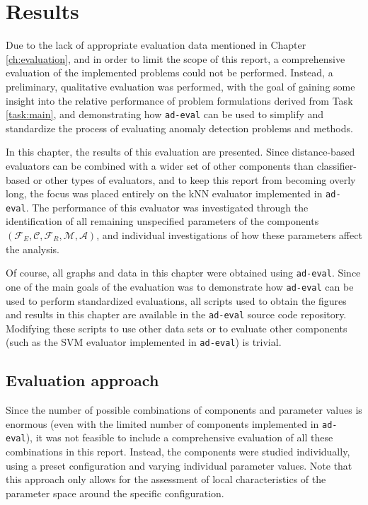 \chapter{Results}
\label{ch:results}

Due to the lack of appropriate evaluation data mentioned in Chapter \ref{ch:evaluation}, and in order to limit the scope of this report, a comprehensive evaluation of the implemented problems could not be performed. Instead, a preliminary, qualitative evaluation was performed, with the goal of gaining some insight into the relative performance of problem formulations derived from Task \ref{task:main}, and demonstrating how \texttt{ad-eval} can be used to simplify and standardize the process of evaluating anomaly detection problems and methods. 

In this chapter, the results of this evaluation are presented. Since distance-based evaluators can be combined with a wider set of other components than classifier-based or other types of evaluators, and to keep this report from becoming overly long, the focus was placed entirely on the kNN evaluator implemented in \texttt{ad-eval}. The performance of this evaluator was investigated through the identification of all remaining unspecified parameters of the components $(\mathcal{F}_E, \mathcal{C}, \mathcal{F}_R, \mathcal{M},\mathcal{A})$, and individual investigations of how these parameters affect the analysis.

Of course, all graphs and data in this chapter were obtained using \texttt{ad-eval}. Since one of the main goals of the evaluation was to demonstrate how \texttt{ad-eval} can be used to perform standardized evaluations, all scripts used to obtain the figures and results in this chapter are available in the \texttt{ad-eval} source code repository. Modifying these scripts to use other data sets or to evaluate other components (such as the SVM evaluator implemented in \texttt{ad-eval}) is trivial.

\section{Evaluation approach}

Since the number of possible combinations of components and parameter values is enormous (even with the limited number of components implemented in \texttt{ad-eval}), it was not feasible to include a comprehensive evaluation of all these combinations in this report. Instead, the components were studied individually, using a preset configuration and varying individual parameter values. Note that this approach only allows for the assessment of local characteristics of the parameter space around the specific configuration.

